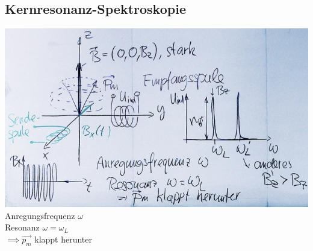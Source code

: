 \subsection{Kernresonanz-Spektroskopie}
\includegraphics{Bild222} \\
Anregungsfrequenz $\omega$ \\
Resonanz $\omega = \omega_L$ \\
$\implies \vec{p_m}$ klappt herunter


















